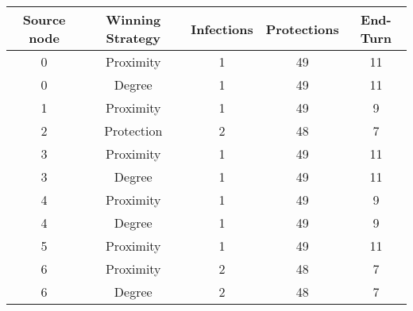 \documentclass[results.tex]{subfiles}
\begin{document}
    \begin{center}
        \begin{tabular}{| c || c | c | c | c |}
            \hline
            {\bfseries Source node} & {\bfseries Winning Strategy} & {\bfseries Infections} & {\bfseries Protections}
            & {\bfseries End-Turn}
            \\  %
            \hline\hline
            0                       & Proximity                    & 1                      & 49                      & 11                   \\
            \hline
            0                       & Degree                       & 1                      & 49                      & 11                   \\
            \hline
            1                       & Proximity                    & 1                      & 49                      & 9                    \\
            \hline
            2                       & Protection                   & 2                      & 48                      & 7                    \\
            \hline
            3                       & Proximity                    & 1                      & 49                      & 11                   \\
            \hline
            3                       & Degree                       & 1                      & 49                      & 11                   \\
            \hline
            4                       & Proximity                    & 1                      & 49                      & 9                    \\
            \hline
            4                       & Degree                       & 1                      & 49                      & 9                    \\
            \hline
            5                       & Proximity                    & 1                      & 49                      & 11                   \\
            \hline
            6                       & Proximity                    & 2                      & 48                      & 7                    \\
            \hline
            6                       & Degree                       & 2                      & 48                      & 7                    \\

\end{tabular}
\end{center}
\end{document}
